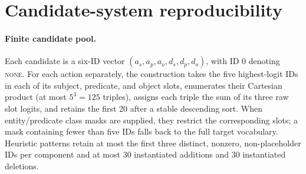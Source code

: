 \documentclass[a4paper,UKenglish,cleveref,autoref,thm-restate]{tgdk-v2021}
\begin{document}
\begin{table}[ht]
\caption{Candidate availability and selection by system. Each rate cell reports availability/selection (A/S) as percentages. ``Eligible'' restricts the denominator to the 54,234 instances whose primary constraint is checkable and violated before repair; ``+ base'' additionally requires the base statement to remain present. Candidate--SR shares the frozen Direct--Factor proposal generator, so their availability rates are identical. Arrows indicate that higher rates are preferred under the stated suitability requirements.}
\label{tab:candidate-oracle}
\centering
\small
{}
\end{table}

\section{Candidate-system reproducibility}
\label{sec:candidate-reproducibility}

\paragraph*{Finite candidate pool.}
Each candidate is a six-ID vector \((a_s,a_p,a_o,d_s,d_p,d_o)\), with ID 0 denoting \textsc{none}. For each action separately, the construction takes the five highest-logit IDs in each of its subject, predicate, and object slots, enumerates their Cartesian product (at most \(5^3=125\) triples), assigns each triple the sum of its three raw slot logits, and retains the first 20 after a stable descending sort. When entity/predicate class masks are supplied, they restrict the corresponding slots; a mask containing fewer than five IDs falls back to the full target vocabulary. Heuristic patterns retain at most the first three distinct, nonzero, non-placeholder IDs per component and at most 30 instantiated additions and 30 instantiated deletions.
\end{document}
